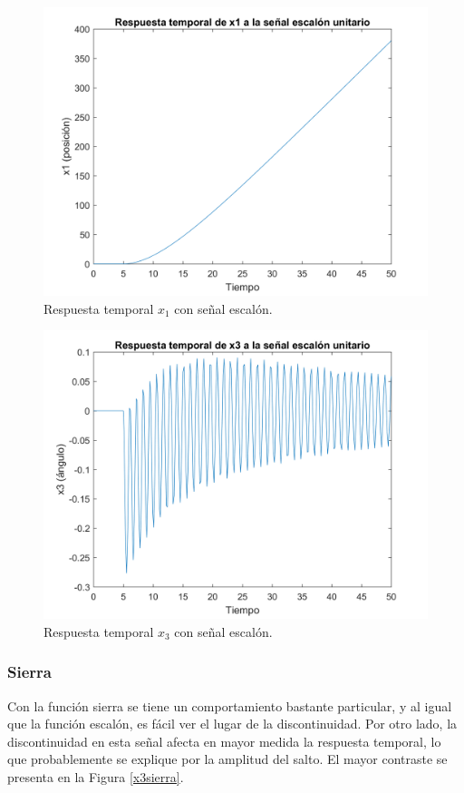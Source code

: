 \documentclass[journal]{IEEEtran}
\begin{document}
\begin{figure}[ht!]
\caption{Respuesta temporal $x_1$ con señal escalón.\label{x1step}}
  \centering
\includegraphics[scale=0.18]{figures/x1step.png}
\end{figure}

\begin{figure}[ht!]
\caption{Respuesta temporal $x_3$ con señal escalón.\label{x3step}}
  \centering
\includegraphics[scale=0.18]{figures/x3step.png}
\end{figure}

\subsubsection*{Sierra}
Con la función sierra se tiene un comportamiento bastante particular, y al igual que la función escalón, es fácil ver el lugar de la discontinuidad. Por otro lado, la discontinuidad en esta señal afecta en mayor medida la respuesta temporal, lo que probablemente se explique por la amplitud del salto. El mayor contraste se presenta en la Figura \ref{x3sierra}.\\
\end{document}
